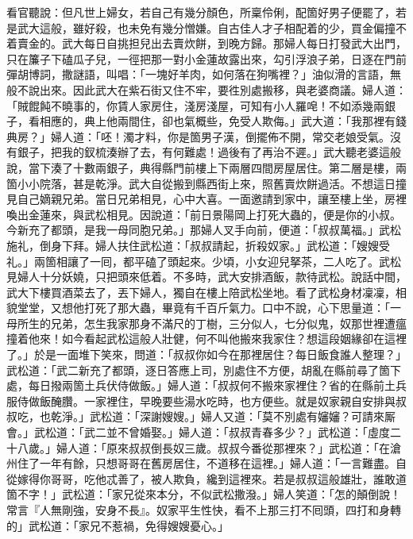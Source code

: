 看官聽說：但凡世上婦女，若自己有幾分顏色，所稟伶俐，配箇好男子便罷了，若是武大這般，雖好殺，也未免有幾分憎嫌。{}自古佳人才子相配着的少，買金偏撞不着賣金的。武大每日自挑担兒出去賣炊餅，到晚方歸。那婦人每日打發武大出門，只在簾子下磕瓜子兒，{}一徑把那一對小金蓮故露出來，勾引浮浪子弟，日逐在門前彈胡博詞，撒謎語，叫唱：「一塊好羊肉，如何落在狗嘴裡？」油似滑的言語，無般不說出來。因此武大在紫石街又住不牢，要徃別處搬移，與老婆商議。婦人道：「賊餛飩不曉事的，你賃人家房住，淺房淺屋，可知有小人羅唣！不如添幾兩銀子，看相應的，典上他兩間住，卻也氣概些，免受人欺侮。」武大道：「我那裡有錢典房？」婦人道：「呸！濁才料，你是箇男子漢，倒擺佈不開，常交老娘受氣。沒有銀子，把我的釵梳湊辦了去，有何難處！過後有了再治不遲。」{}武大聽老婆這般說，當下湊了十數兩銀子，典得縣門前樓上下兩層四間房屋居住。第二層是樓，兩箇小小院落，甚是乾淨。武大自從搬到縣西街上來，照舊賣炊餅過活。不想這日撞見自己嫡親兄弟。當日兄弟相見，心中大喜。一面邀請到家中，讓至樓上坐，房裡喚出金蓮來，與武松相見。因說道：「前日景陽岡上打死大蟲的，便是你的小叔。{}今新充了都頭，是我一母同胞兄弟。」{}那婦人叉手向前，便道：「叔叔萬福。」武松施礼，倒身下拜。婦人扶住武松道：「叔叔請起，折殺奴家。」武松道：「嫂嫂受礼。」兩箇相讓了一囘，都平磕了頭起來。少頃，小女迎兒拏茶，二人吃了。武松見婦人十分妖嬈，只把頭來低着。{}不多時，武大安排酒飯，款待武松。說話中間，武大下樓買酒菜去了，丟下婦人，獨自在樓上陪武松坐地。看了武松身材凜凜，相貌堂堂，{}又想他打死了那大蟲，畢竟有千百斤氣力。{}口中不說，心下思量道：「一母所生的兄弟，怎生我家那身不滿尺的丁樹，三分似人，七分似鬼，奴那世裡遭瘟撞着他來！如今看起武松這般人壯健，何不叫他搬來我家住？想這段姻緣卻在這裡了。」{}於是一面堆下笑來，問道：「叔叔你如今在那裡居住？每日飯食誰人整理？」武松道：「武二新充了都頭，逐日答應上司，別處住不方便，胡亂在縣前尋了箇下處，每日撥兩箇土兵伏侍做飯。」婦人道：「叔叔何不搬來家裡住？省的在縣前土兵服侍做飯醃臢。一家裡住，早晚要些湯水吃時，也方便些。就是奴家親自安排與叔叔吃，也乾淨。」武松道：「深謝嫂嫂。」婦人又道：「莫不別處有嬸嬸？{}可請來厮會。」武松道：「武二並不曾婚娶。」婦人道：「叔叔青春多少？」武松道：「虛度二十八歲。」婦人道：「原來叔叔倒長奴三歲。叔叔今番從那裡來？」武松道：「在滄州住了一年有餘，只想哥哥在舊房居住，不道移在這裡。」婦人道：「一言難盡。自從嫁得你哥哥，吃他忒善了，被人欺負，纔到這裡來。若是叔叔這般雄壯，{}誰敢道箇不字！」武松道：「家兄從來本分，不似武松撒潑。」{}婦人笑道：「怎的顛倒說！常言『人無剛強，安身不長』。奴家平生性快，看不上那三打不囘頭，四打和身轉的」武松道：「家兄不惹禍，免得嫂嫂憂心。」

